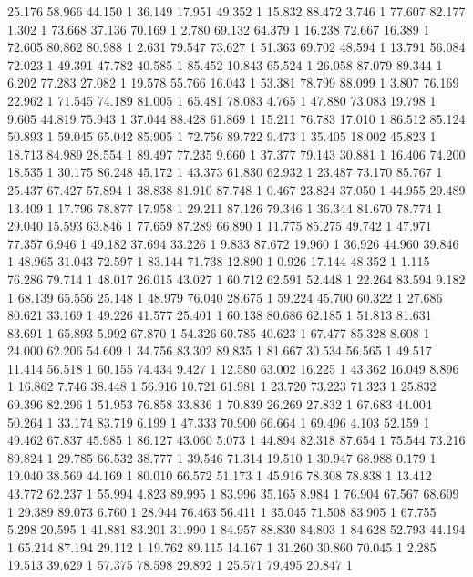 	25.176	58.966	44.150	1
	36.149	17.951	49.352	1
	15.832	88.472	3.746	1
	77.607	82.177	1.302	1
	73.668	37.136	70.169	1
	2.780	69.132	64.379	1
	16.238	72.667	16.389	1
	72.605	80.862	80.988	1
	2.631	79.547	73.627	1
	51.363	69.702	48.594	1
	13.791	56.084	72.023	1
	49.391	47.782	40.585	1
	85.452	10.843	65.524	1
	26.058	87.079	89.344	1
	6.202	77.283	27.082	1
	19.578	55.766	16.043	1
	53.381	78.799	88.099	1
	3.807	76.169	22.962	1
	71.545	74.189	81.005	1
	65.481	78.083	4.765	1
	47.880	73.083	19.798	1
	9.605	44.819	75.943	1
	37.044	88.428	61.869	1
	15.211	76.783	17.010	1
	86.512	85.124	50.893	1
	59.045	65.042	85.905	1
	72.756	89.722	9.473	1
	35.405	18.002	45.823	1
	18.713	84.989	28.554	1
	89.497	77.235	9.660	1
	37.377	79.143	30.881	1
	16.406	74.200	18.535	1
	30.175	86.248	45.172	1
	43.373	61.830	62.932	1
	23.487	73.170	85.767	1
	25.437	67.427	57.894	1
	38.838	81.910	87.748	1
	0.467	23.824	37.050	1
	44.955	29.489	13.409	1
	17.796	78.877	17.958	1
	29.211	87.126	79.346	1
	36.344	81.670	78.774	1
	29.040	15.593	63.846	1
	77.659	87.289	66.890	1
	11.775	85.275	49.742	1
	47.971	77.357	6.946	1
	49.182	37.694	33.226	1
	9.833	87.672	19.960	1
	36.926	44.960	39.846	1
	48.965	31.043	72.597	1
	83.144	71.738	12.890	1
	0.926	17.144	48.352	1
	1.115	76.286	79.714	1
	48.017	26.015	43.027	1
	60.712	62.591	52.448	1
	22.264	83.594	9.182	1
	68.139	65.556	25.148	1
	48.979	76.040	28.675	1
	59.224	45.700	60.322	1
	27.686	80.621	33.169	1
	49.226	41.577	25.401	1
	60.138	80.686	62.185	1
	51.813	81.631	83.691	1
	65.893	5.992	67.870	1
	54.326	60.785	40.623	1
	67.477	85.328	8.608	1
	24.000	62.206	54.609	1
	34.756	83.302	89.835	1
	81.667	30.534	56.565	1
	49.517	11.414	56.518	1
	60.155	74.434	9.427	1
	12.580	63.002	16.225	1
	43.362	16.049	8.896	1
	16.862	7.746	38.448	1
	56.916	10.721	61.981	1
	23.720	73.223	71.323	1
	25.832	69.396	82.296	1
	51.953	76.858	33.836	1
	70.839	26.269	27.832	1
	67.683	44.004	50.264	1
	33.174	83.719	6.199	1
	47.333	70.900	66.664	1
	69.496	4.103	52.159	1
	49.462	67.837	45.985	1
	86.127	43.060	5.073	1
	44.894	82.318	87.654	1
	75.544	73.216	89.824	1
	29.785	66.532	38.777	1
	39.546	71.314	19.510	1
	30.947	68.988	0.179	1
	19.040	38.569	44.169	1
	80.010	66.572	51.173	1
	45.916	78.308	78.838	1
	13.412	43.772	62.237	1
	55.994	4.823	89.995	1
	83.996	35.165	8.984	1
	76.904	67.567	68.609	1
	29.389	89.073	6.760	1
	28.944	76.463	56.411	1
	35.045	71.508	83.905	1
	67.755	5.298	20.595	1
	41.881	83.201	31.990	1
	84.957	88.830	84.803	1
	84.628	52.793	44.194	1
	65.214	87.194	29.112	1
	19.762	89.115	14.167	1
	31.260	30.860	70.045	1
	2.285	19.513	39.629	1
	57.375	78.598	29.892	1
	25.571	79.495	20.847	1
